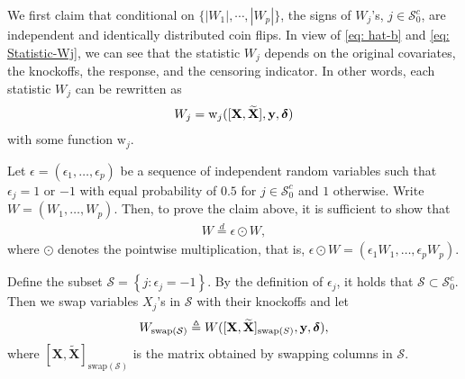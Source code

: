 \documentclass[11pt]{article}
\newcommand{\bdelta}{\mbox{\boldmath $\delta$}}
\def\y{{\bf y}}
\begin{document}
\vspace{8mm}
  We first claim that conditional on $\{|W_1|, \cdots, |W_p|\}$,  the signs of $W_j$'s, $j\in \mathcal{S}_0^c$, are independent and identically distributed coin flips. In view of \eqref{eq: hat-b} and \eqref{eq: Statistic-Wj}, we can see that the statistic $W_j$ depends on the original covariates, the knockoffs, the response, and the censoring indicator. In other words,  each statistic $W_j$ can be rewritten as
\begin{align*}
W_j = \mathrm{w}_j([\mathbf{X},\widetilde{\mathbf{X}}],\y,\bdelta)
\end{align*}
with some function $\mathrm{w}_j$. 

Let  $\epsilon=(\epsilon_{1},\ldots,\epsilon_{p})$
be a sequence of independent random variables
such that $\epsilon_{j}=1$ or $-1$ with equal probability of $0.5$ for $j\in\mathcal{S}_0^c$ and $1$ otherwise. Write $W=(W_1, \ldots, W_p)$. Then, to prove %
the claim above, it is sufficient to show that
\begin{align}\label{eq: W-flip-coin}
W \overset{d}= \epsilon \odot W,
\end{align}
where $\odot$ denotes the pointwise multiplication, that is, $\epsilon \odot W=(\epsilon_{1} W_{1}, \ldots, \epsilon_{p} W_{p})$. 

Define the subset $\mathcal{S}=\left\{j: \epsilon_{j}=-1\right\}$. By the definition of $\epsilon_{j}$, it holds that $\mathcal{S} \subset \mathcal{S}_{0}^c$. Then we swap variables $X_j$'s in $\mathcal{S}$ with their knockoffs and let
\begin{align*}
W_{\mathrm{swap}(\mathcal{S})}\triangleq W([\mathbf{X}, \widetilde{\mathbf{X}}]_{\mathrm{swap}(S)}, \y,\bdelta),
\end{align*}
where $[\mathbf{X},\widetilde{\mathbf{X}}]_{\mathrm{swap}(\mathcal{S})}$ is the matrix obtained by swapping columns in $\mathcal{S}$.
\end{document}
